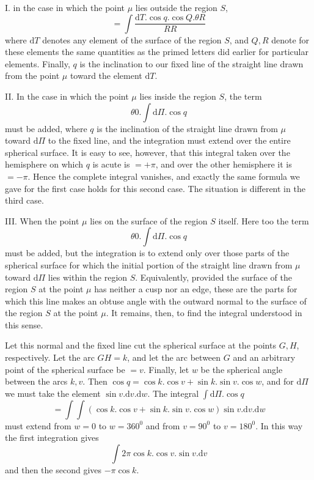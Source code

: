 I. in the case in which the point $\mu$ lies outside the region $S$,
\[
=\int\frac{\mathrm{d}T.\cos q.\cos Q.\theta R}{RR}
\]
where $\mathrm{d}T$ denotes any element of the surface of the region $S$, and $Q,R$ denote for these elements the same quantities as the primed letters did earlier for particular elements. Finally, $q$ is the inclination to our fixed line of the straight line drawn from the point $\mu$ toward the element $\mathrm{d}T$.

II. In the case in which the point $\mu$ lies inside the region $S$, the term
\[
\theta0.\int\mathrm{d}\Pi.\cos q
\]
must be added, where $q$ is the inclination of the straight line drawn from $\mu$ toward $\mathrm{d}\Pi$ to the fixed line, and the integration must extend over the entire spherical surface. It is easy to see, however, that this integral taken over the hemisphere on which $q$ is acute is $=+\pi$, and over the other hemisphere it is $=-\pi$. Hence the complete integral vanishes, and exactly the same formula we gave for the first case holds for this second case. The situation is different in the third case.

III. When the point $\mu$ lies on the surface of the region $S$ itself. Here too the term
\[
\theta0.\int\mathrm{d}\Pi.\cos q
\]
must be added, but the integration is to extend only over those parts of the spherical surface for which the initial portion of the straight line drawn from $\mu$ toward $\mathrm{d}\Pi$ lies within the region $S$. Equivalently, provided the surface of the region $S$ at the point $\mu$ has neither a cusp nor an edge, these are the parts for which this line makes an obtuse angle with the outward normal to the surface of the region $S$ at the point $\mu$. It remains, then, to find the integral understood in this sense.

Let this normal and the fixed line cut the spherical surface at the points $G,H$, respectively. Let the arc $GH=k$, and let the arc between $G$ and an arbitrary point of the spherical surface be $=v$. Finally, let $w$ be the spherical angle between the arcs $k,v$. Then $\cos q=\cos k.\cos v+\sin k.\sin v.\cos w$, and for $\mathrm{d}\Pi$ we must take the element $\sin v.\mathrm{d}v.\mathrm{d}w$. The integral $\int\mathrm{d}\Pi.\cos q$
\[
=\int\int(\cos k.\cos v+\sin k.\sin v.\cos w)\sin v.\mathrm{d}v.\mathrm{d}w
\]
must extend from $w=0$ to $w=360^0$ and from $v=90^0$ to $v=180^0$. In this way the first integration gives
\[
\int2\pi\cos k.\cos v.\sin v.\mathrm{d}v
\]
and then the second gives $-\pi\cos k$.

